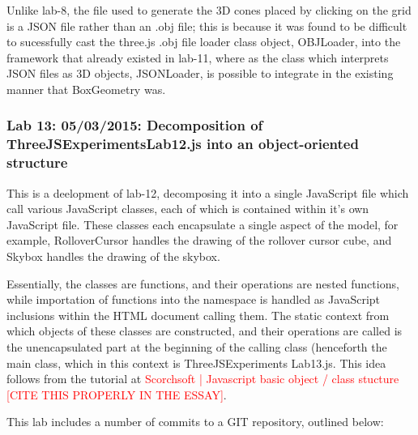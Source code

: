 Unlike lab-8, the file used to generate the 3D cones placed by clicking on the grid is a JSON file rather than an .obj file; this is because it was found to be difficult to sucessfully cast the three.js .obj file loader class object, OBJLoader, into the framework that already existed in lab-11, where as the class which interprets JSON files as 3D objects, JSONLoader, is possible to integrate in the existing manner that BoxGeometry was.

\subsubsection{Lab 13: 05/03/2015: Decomposition of ThreeJSExperiments\textunderscore Lab12.js into an object-oriented structure}
\label{subSubSec:ThreeJSExperiments:Lab13}
This is a deelopment of lab-12, decomposing it into a single JavaScript file which call various JavaScript classes, each of which is contained within it's own JavaScript file. These classes each encapsulate a single aspect of the model, for example, RolloverCursor handles the drawing of the rollover cursor cube, and Skybox handles the drawing of the skybox.

Essentially, the classes are functions, and their operations are nested functions, while importation of functions into the namespace is handled as JavaScript inclusions within the HTML document calling them. The static context from which objects of these classes are constructed, and their operations are called is the unencapsulated part at the beginning of the calling class (henceforth the main class, which in this context is ThreeJSExperiments Lab13.js. This idea follows from the tutorial at \textcolor{red}{Scorchsoft | Javascript basic object / class stucture [CITE THIS PROPERLY IN THE ESSAY]}.

This lab includes a number of commits to a GIT repository, outlined below:

